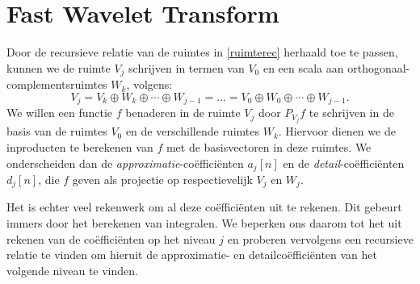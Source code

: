 \section{Fast Wavelet Transform}

Door de recursieve relatie van de ruimtes in \eqref{ruimterec} herhaald toe te passen,
kunnen we de ruimte $V_j$ schrijven in termen van $V_0$ en een scala aan
orthogonaal-complementsruimtes $W_k$, volgens:
\begin{equation}
  \label{ruimte_splitsing}
  V_j = V_k \oplus W_k \oplus \cdots \oplus W_{j-1} = \ldots
  = V_0 \oplus W_0 \oplus \cdots \oplus W_{j-1}.
\end{equation}
We willen een functie $f$ benaderen in de ruimte $V_j$ door $P_{V_j}f$ te schrijven in
de basis van de ruimtes $V_0$ en de verschillende ruimtes $W_k$. Hiervoor dienen we de inproducten
te berekenen van $f$ met de basisvectoren in deze ruimtes.
We onderscheiden dan de \emph{approximatie}-co\"effici\"enten $a_j[n]$ en 
de \emph{detail}-co\"effici\"enten $d_j[n]$, die
$f$ geven als projectie op  respectievelijk $V_j$ en $W_j$.

Het is echter veel rekenwerk om al deze co\"effici\"enten uit te rekenen. 
Dit gebeurt immers door het berekenen van integralen. 
We beperken ons daarom tot het uit rekenen van de co\"effici\"enten op het niveau $j$ 
en proberen vervolgens een recursieve relatie te vinden
om hieruit de approximatie- en detailco\"effici\"enten van het volgende niveau te vinden.

